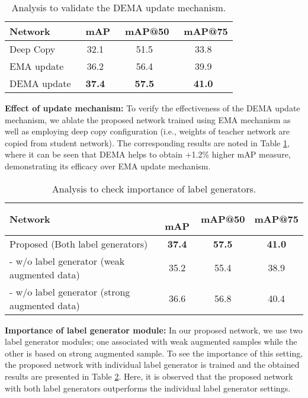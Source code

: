 \documentclass[10pt,twocolumn,letterpaper]{article}
\begin{document}
\begin{table}[t!]
\centering
\caption{Analysis to validate the DEMA update mechanism.} \label{abl:updatemechanism}
\vspace{-0.5em}
\begin{adjustbox}{width=.7\linewidth,center}
\begin{tabular}{l|ccc}
\cline{1-4}
\textbf{Network}  &\, \textbf{mAP}  & \, \textbf{mAP@50} &\, \textbf{mAP@75} \\ \hline 
Deep Copy           & 32.1 & 51.5   & 33.8   \\
EMA update    & 36.2 & 56.4   & 39.9   \\
DEMA update & \textbf{37.4} & \textbf{57.5}   & \textbf{41.0}  \\ \hline
\end{tabular}
\end{adjustbox}
\end{table}
\textbf{Effect of update mechanism:} To verify the effectiveness of the DEMA update mechanism, we ablate the proposed network trained using EMA mechanism as well as employing deep copy configuration (i.e., weights of teacher network are copied from student network). The corresponding results are noted in Table \ref{abl:updatemechanism}, where it can be seen that DEMA helps to obtain +1.2\% higher mAP measure, demonstrating its efficacy over EMA update mechanism.

\begin{table}[t!]
\centering
\caption{Analysis to check importance of label generators.}\label{abl:labelgenerator}
\vspace{-0.5em}
\begin{adjustbox}{width=.99\linewidth,center}
\begin{tabular}{l|ccc}
\cline{1-4}
\textbf{Network}                                              &\, \textbf{mAP}  & \textbf{mAP@50} & \textbf{mAP@75} \\ \hline 
Proposed (Both label generators)  & \textbf{37.4} & \textbf{57.5}   & \textbf{41.0}   \\ 
\quad - w/o label generator (weak augmented data)   & 35.2 & 55.4   & 38.9   \\
\quad - w/o label generator (strong augmented data) & 36.6 & 56.8   & 40.4   \\
\hline
\end{tabular}
\end{adjustbox}
\end{table}
\textbf{Importance of label generator module:} In our proposed network, we use two label generator modules; one associated with weak augmented samples while the other is based on strong augmented sample. To see the importance of this setting, the proposed network with individual label generator is trained and the obtained results are presented in Table \ref{abl:labelgenerator}. Here, it is observed that the proposed network with both label generators outperforms the individual label generator settings. 
\end{document}
